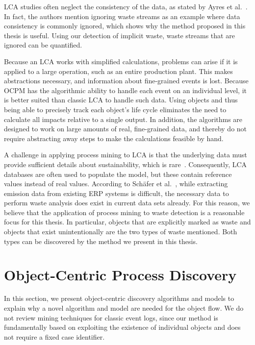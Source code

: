     LCA studies often neglect the consistency of the data, as stated by Ayres et al.~\autocite{ayres1995}.
    In fact, the authors mention ignoring waste streams as an example where data consistency is commonly ignored, which shows why the method proposed in this thesis is useful.
    Using our detection of implicit waste, waste streams that are ignored can be quantified.

    Because an LCA works with simplified calculations, problems can arise if it is applied to a large operation, such as an entire production plant.
    This makes abstractions necessary, and information about fine-grained events is lost.
    Because OCPM has the algorithmic ability to handle each event on an individual level, it is better suited than classic LCA to handle such data.
    Using objects and thus being able to precisely track each object's life cycle eliminates the need to calculate all impacts relative to a single output.
    In addition, the algorithms are designed to work on large amounts of real, fine-grained data, and thereby do not require abstracting away steps to make the calculations feasible by hand.



A challenge in applying process mining to LCA is that the underlying data must provide sufficient details about sustainability, which is rare~\autocite{schafer2024}.
Consequently, LCA databases are often used to populate the model, but these contain reference values instead of real values.
According to Schäfer et al.~\autocite{schafer2024}, while extracting emission data from existing ERP systems is difficult, the necessary data to perform waste analysis does exist in current data sets already.
For this reason, we believe that the application of process mining to waste detection is a reasonable focus for this thesis.
In particular, objects that are explicitly marked as waste and objects that exist unintentionally are the two types of waste mentioned.
Both types can be discovered by the method we present in this thesis.



\section{Object-Centric Process Discovery}



In this section, we present object-centric discovery algorithms and models to explain why a novel algorithm and model are needed for the object flow.
We do not review mining techniques for classic event logs, since our method is fundamentally based on exploiting the existence of individual objects and does not require a fixed case identifier.




